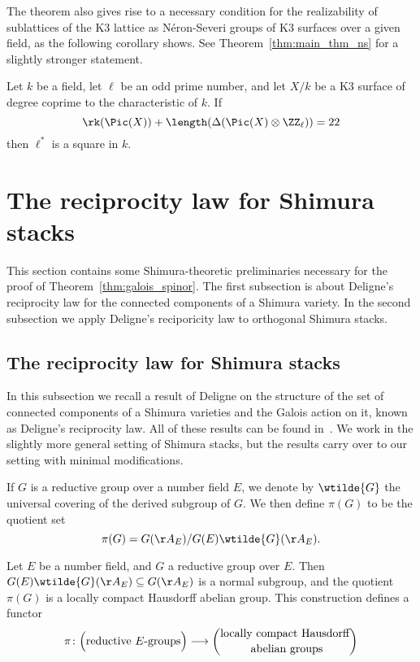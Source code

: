 The theorem also gives rise to a necessary condition for the realizability of sublattices of the K3 lattice as N\'eron-Severi groups of K3 surfaces over a given field, as the following corollary shows. See Theorem~\ref{thm:main_thm_ns} for a slightly stronger statement.

\begin{corollary}
Let $k$ be a field, let $\ell$ be an odd prime number, and let $X/k$ be a K3 surface of degree coprime to the characteristic of $k$. If
$$
\rk(\Pic(X)) + \length(\Delta(\Pic(X) \otimes \ZZ_{\ell})) = 22
$$
then $\ell^*$ is a square in $k$.
\end{corollary}


\section{The reciprocity law for Shimura stacks}
This section contains some Shimura-theoretic preliminaries necessary for the proof of Theorem~\ref{thm:galois_spinor}. The first subsection is about Deligne's reciprocity law for the connected components of a Shimura variety. In the second subsection we apply Deligne's reciporicity law to orthogonal Shimura stacks.

\subsection{The reciprocity law for Shimura stacks}\label{sec:reciprocity_law_shimura_stacks}
In this subsection we recall a result of Deligne on the structure of the set of connected components of a Shimura varieties and the Galois action on it, known as Deligne's reciprocity law. All of these results can be found in~\cite{Deligne79}. We work in the slightly more general setting of Shimura stacks, but the results carry over to our setting with minimal modifications.

If $G$ is a reductive group over a number field $E$, we denote by $\wtilde{G}$ the universal covering of the derived subgroup of $G$. We then define $\pi(G)$ to be the quotient set
$$
\pi(G) = G(\AA_E)/G(E)\wtilde{G}(\AA_E).
$$
\begin{lemma}
Let $E$ be a number field, and $G$ a reductive group over $E$. Then $G(E)\wtilde{G}(\AA_E) \subseteq G(\AA_E)$ is a normal subgroup, and the quotient $\pi(G)$ is a locally compact Hausdorff abelian group. This construction defines a functor
$$
\pi\colon \Big( \textnormal{reductive } E\textnormal{-groups} \Big) \longrightarrow \binom{ \textnormal{locally compact Hausdorff}}{\textnormal{ abelian groups}}
$$
\end{lemma}

